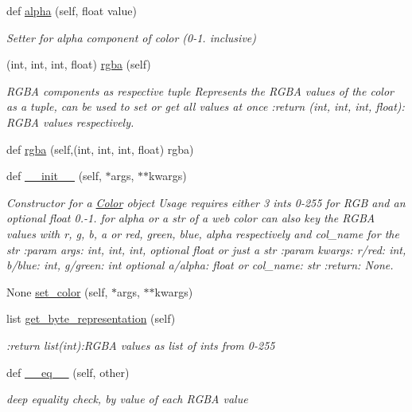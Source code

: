 \begin{DoxyCompactItemize}
def \mbox{\hyperlink{classbridges_1_1color_1_1_color_a83fb51809b6fec53a1ce4a5419e97498}{alpha}} (self, float value)
\begin{DoxyCompactList}\small\item\em Setter for alpha component of color (0-\/1. inclusive) \end{DoxyCompactList}\item 
(int, int, int, float) \mbox{\hyperlink{classbridges_1_1color_1_1_color_aa0e83c31afdaaf5c33e871bc6bb98121}{rgba}} (self)
\begin{DoxyCompactList}\small\item\em R\+G\+BA components as respective tuple Represents the R\+G\+BA values of the color as a tuple, can be used to set or get all values at once \+:return (int, int, int, float)\+: R\+G\+BA values respectively. \end{DoxyCompactList}\item 
def \mbox{\hyperlink{classbridges_1_1color_1_1_color_a3589024e5c4821134f8f54ac3fa3b7c1}{rgba}} (self,(int, int, int, float) rgba)
\item 
def \mbox{\hyperlink{classbridges_1_1color_1_1_color_a5112eb024e94719da5be15c0b656f1ab}{\+\_\+\+\_\+init\+\_\+\+\_\+}} (self, $\ast$args, $\ast$$\ast$kwargs)
\begin{DoxyCompactList}\small\item\em Constructor for a \mbox{\hyperlink{classbridges_1_1color_1_1_color}{Color}} object Usage requires either 3 ints 0-\/255 for R\+GB and an optional float 0.-\/1. for alpha or a str of a web color can also key the R\+G\+BA values with r, g, b, a or red, green, blue, alpha respectively and col\+\_\+name for the str \+:param args\+: int, int, int, optional float or just a str \+:param kwargs\+: r/red\+: int, b/blue\+: int, g/green\+: int optional a/alpha\+: float or col\+\_\+name\+: str \+:return\+: None. \end{DoxyCompactList}\item 
None \mbox{\hyperlink{classbridges_1_1color_1_1_color_ad3f8ee817cc7f3fa0e9b606c791141e7}{set\+\_\+color}} (self, $\ast$args, $\ast$$\ast$kwargs)
\item 
list \mbox{\hyperlink{classbridges_1_1color_1_1_color_a995abdd27110a84d9e8fb539cf3196b8}{get\+\_\+byte\+\_\+representation}} (self)
\begin{DoxyCompactList}\small\item\em \+:return list(int)\+:R\+G\+BA values as list of ints from 0-\/255 \end{DoxyCompactList}\item 
def \mbox{\hyperlink{classbridges_1_1color_1_1_color_ae5677a0858252f0b33da13866fb62786}{\+\_\+\+\_\+eq\+\_\+\+\_\+}} (self, other)
\begin{DoxyCompactList}\small\item\em deep equality check, by value of each R\+G\+BA value \end{DoxyCompactList}\end{DoxyCompactItemize}
